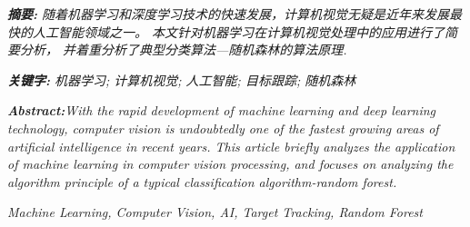 \documentclass[UTF8,a4paper,10pt,nocolorlinks]{ctexart}
\begin{document}
    \begin{adjustwidth}{0cm}{0cm}
        \emph{\textbf{摘\hspace{0.5em}要:} 随着机器学习和深度学习技术的快速发展，计算机视觉无疑是近年来发展最快的人工智能领域之一。
        本文针对机器学习在计算机视觉处理中的应用进行了简要分析，
        并着重分析了典型分类算法—随机森林的算法原理.
        }
        \begin{flushleft}
        \emph{{\textbf{关键字:}} 机器学习; 计算机视觉; 人工智能; 目标跟踪; 随机森林 } %
        \end{flushleft}
    \end{adjustwidth}
    \begin{adjustwidth}{0cm}{0cm}
        \emph{\textbf{Abstract:}With the rapid development of machine learning and deep learning technology, computer vision is undoubtedly one of the fastest growing areas of artificial intelligence in recent years. This article briefly analyzes the application of machine learning in computer vision processing, and focuses on analyzing the algorithm principle of a typical classification algorithm-random forest.}\par
    \end{adjustwidth}
    \begin{keywords}
        \emph{\noindent Machine Learning, Computer Vision, AI, Target Tracking, Random Forest}
    \end{keywords}
    \setcounter{page}{1}        %
\end{document}
